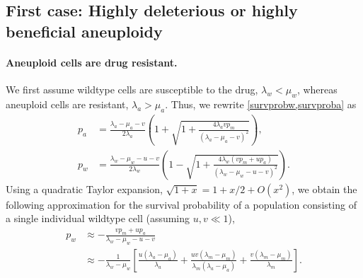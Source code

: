 \documentclass[12pt]{extarticle}
\begin{document}

\subsection*{First case: Highly deleterious or highly beneficial aneuploidy}

\paragraph{Aneuploid cells are drug resistant.} 
We first assume wildtype cells are susceptible to the drug, $\lambda_w<\mu_w$, whereas aneuploid cells are resistant, $\lambda_a>\mu_a$.
Thus, we rewrite \cref{survprobw,survproba} as
\begin{align*}
p_a&=\frac{\lambda_a-\mu_a-v}{2\lambda_a}\left(1+\sqrt{1+\frac{4\lambda_avp_m}{\left(\lambda_a-\mu_a-v\right)^2}}\right),\\
p_w&=\frac{\lambda_w-\mu_w-u-v}{2\lambda_w}\left(1-\sqrt{1+\frac{4\lambda_w\left(vp_m+up_a\right)}{\left(\lambda_w-\mu_w-u-v\right)^2}}\right).
\end{align*}
Using a quadratic Taylor expansion, $\sqrt{1+x}=1+x/2+O(x^2)$, 
we obtain the following approximation for the survival probability of a population consisting of a single individual wildtype cell (assuming $u,v \ll 1$),
\begin{align}\label{survprobwinitial}
p_w 
&\approx -\frac{vp_m+up_a}{\lambda_w-\mu_w-u-v}\\
\nonumber
&\approx-\frac{1}{\lambda_w-\mu_w}\left[\frac{u\left(\lambda_a-\mu_a\right)}{\lambda_a}+\frac{uv\left(\lambda_m-\mu_m\right)}{\lambda_m\left(\lambda_a-\mu_a\right)}+\frac{v\left(\lambda_m-\mu_m\right)}{\lambda_m}\right].
\end{align}
\end{document}
